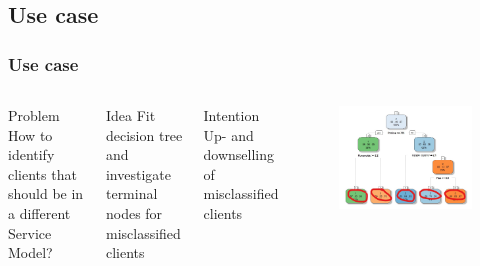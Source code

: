 \documentclass{beamer}\usepackage[]{graphicx}\usepackage[]{color}
\begin{document}
\subsection{Use case}
\begin{frame}[fragile]
\frametitle{Use case}
\begin{columns}[c] %
\begin{block}{Problem}
How to identify clients that should be in a different Service Model?
\end{block}
\begin{block}{Idea}
Fit decision tree and investigate terminal nodes for misclassified clients
\end{block}
\begin{block}{Intention}
Up- and downselling of misclassified clients
\end{block}
\begin{figure}
	\includegraphics[width=\linewidth]{tree_plot.jpg}
\end{figure}
\end{columns}
\end{frame}
\end{document}
